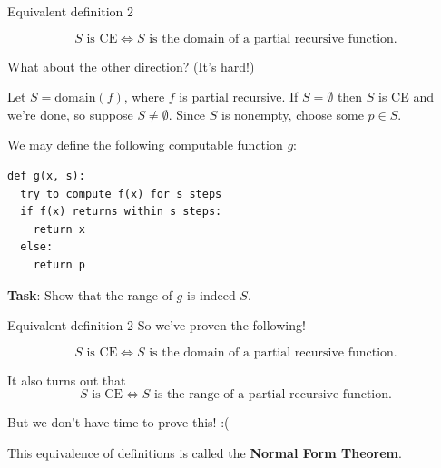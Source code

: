 \documentclass{beamer}
\begin{document}
\begin{frame}[fragile]{Equivalent definition 2}

$$\text{$S$ is CE} \Leftrightarrow \text{$S$ is the domain of a partial recursive function}.$$

What about the other direction? (It's hard!)

\pause

Let $S = \text{domain}(f)$, where $f$ is partial recursive. If $S = \emptyset$ then $S$ is CE and we're done, so suppose $S \neq \emptyset$. Since $S$ is nonempty, choose some $p \in S$.

We may define the following computable function $g$:
\begin{verbatim}
def g(x, s):
  try to compute f(x) for s steps
  if f(x) returns within s steps:
    return x
  else: 
    return p
\end{verbatim}

\textbf{Task}: Show that the range of $g$ is indeed $S$.

\end{frame}

\begin{frame}[fragile]{Equivalent definition 2}
So we've proven the following!

$$\text{$S$ is CE} \Leftrightarrow \text{$S$ is the domain of a partial recursive function}.$$

\pause

It also turns out that 
$$\text{$S$ is CE} \Leftrightarrow \text{$S$ is the range of a partial recursive function}.$$

But we don't have time to prove this! :(
\pause

This equivalence of definitions is called the \textbf{Normal Form Theorem}.

\end{frame}
\end{document}
